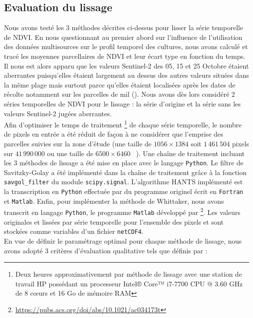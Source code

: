 \subsection{Evaluation du lissage}

Nous avons testé les 3 méthodes décrites ci-dessus pour lisser la série temporelle de NDVI. En nous questionnant au premier abord sur l'influence de l'utilisation des données multisources sur le profil temporel des cultures, nous avons calculé et tracé les moyennes parcellaires de NDVI et leur écart type en fonction du temps. Il nous est alors apparu que les valeurs Sentinel-2 des 05, 15 et 25 Octobre étaient aberrantes puisqu'elles étaient largement au dessus des autres valeurs situées dans la même plage mais surtout parce qu'elles étaient localisées après les dates de récolte notamment sur les parcelles de mil (). Nous avons dès lors considéré 2 séries temporelles de NDVI pour le lissage : la série d'origine et la série sans les valeurs Sentinel-2 jugées aberrantes. 
\\Afin d'optimiser le temps de traitement \footnote{Deux heures approximativement par méthode de lissage avec une station de travail HP possédant un processeur Intel® Core™ i7-7700 CPU @ 3.60 GHz de 8 c\oe urs et 16 Go de mémoire RAM} de chaque série temporelle, le nombre de pixels en entrée a été réduit de façon à ne considérer que l'emprise des parcelles suivies sur la zone d'étude (une taille de $1056\times1384$ soit $1\,461\,504$ pixels sur $41\,990\,000$ ou une taille de $6500\times6460$ ~). Une chaîne de traitement incluant les 3 méthodes de lissage a été mise en place avec le langage \texttt{Python}. Le filtre de Savitzky-Golay a été implémenté dans la chaîne de traitement grâce à la fonction \texttt{savgol\_filter} du module \texttt{scipy.signal}. L'algorithme HANTS implémenté est la transcription en \texttt{Python} effectuée par \citet{Espinoza-Davalos2017} du programme originel écrit en \texttt{Fortran} et \texttt{Matlab}. Enfin, pour implémenter la méthode de Whittaker, nous avons transcrit en langage \texttt{Python}, le programme \texttt{Matlab} développé par \citet{Eilers2003} \footnote{\url{https://pubs.acs.org/doi/abs/10.1021/ac034173t}}. Les valeurs originales et lissées par série temporelle pour l'ensemble des pixels et  sont stockées comme variables d'un fichier \texttt{netCDF4}. 
\\En vue de définir le paramétrage optimal pour chaque méthode de lissage, nous avons adopté 3 critères d'évaluation qualitative tels que définis par \citet{Klisch2006} : 
